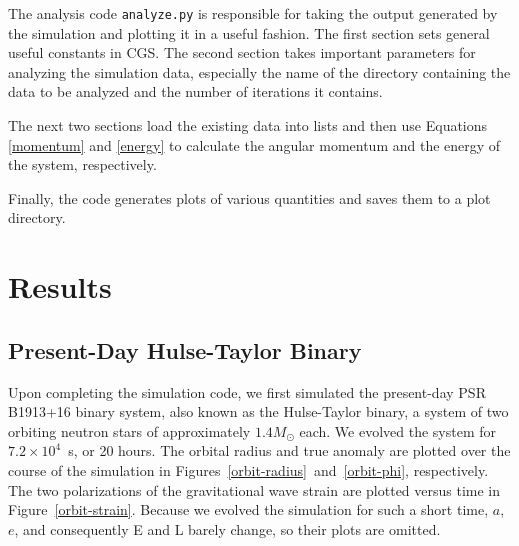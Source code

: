 \documentclass[preprint2]{aastex}
\begin{document}
The analysis code \texttt{analyze.py} is responsible for taking the output generated by the simulation and plotting it in a useful fashion. The first section sets general useful constants in CGS. The second section takes important parameters for analyzing the simulation data, especially the name of the directory containing the data to be analyzed and the number of iterations it contains.

The next two sections load the existing data into lists and then use Equations \eqref{momentum} and \eqref{energy} to calculate the angular momentum and the energy of the system, respectively.

Finally, the code generates plots of various quantities and saves them to a plot directory.

\section{Results}

\subsection{Present-Day Hulse-Taylor Binary}

Upon completing the simulation code, we first simulated the present-day PSR B1913+16 binary system, also known as the Hulse-Taylor binary, a system of two orbiting neutron stars of approximately \(1.4 M_\odot\) each. We evolved the system for \(7.2 \times 10^{4}\)~s, or 20 hours. The orbital radius and true anomaly are plotted over the course of the simulation in Figures~\ref{orbit-radius}~and~\ref{orbit-phi}, respectively. The two polarizations of the gravitational wave strain are plotted versus time in Figure~\ref{orbit-strain}. Because we evolved the simulation for such a short time, \(a\), \(e\), and consequently E and L barely change, so their plots are omitted.
\end{document}
